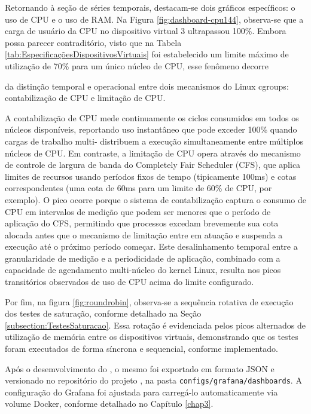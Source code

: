 Retornando à seção de séries temporais, destacam-se dois gráficos específicos: o uso de CPU e o uso de RAM. Na Figura \ref{fig:dashboard-cpu144}, observa-se que a carga de usuário da CPU no dispositivo virtual 3 ultrapassou 100\%. Embora possa parecer contraditório, visto que na Tabela \ref{tab:EspecificaçõesDispositivosVirtuais} foi estabelecido um limite máximo de utilização de 70\% para um único núcleo de CPU, esse fenômeno decorre {\color{red}da distinção temporal e operacional entre dois mecanismos do Linux cgroups: contabilização de CPU e limitação de CPU.

A contabilização de CPU mede continuamente os ciclos consumidos em todos os núcleos disponíveis, reportando uso instantâneo que pode exceder 100\% quando cargas de trabalho multi- distribuem a execução simultaneamente entre múltiplos núcleos de CPU. Em contraste, a limitação de CPU opera através do mecanismo de controle de largura de banda do Completely Fair Scheduler (CFS), que aplica limites de recursos usando períodos fixos de tempo (tipicamente 100ms) e cotas correspondentes (uma cota de 60ms para um limite de 60\% de CPU, por exemplo). O pico ocorre porque o sistema de contabilização captura o consumo de CPU em intervalos de medição que podem ser menores que o período de aplicação do CFS, permitindo que processos excedam brevemente sua cota alocada antes que o mecanismo de limitação entre em atuação e suspenda a execução até o próximo período começar. Este desalinhamento temporal entre a granularidade de medição e a periodicidade de aplicação, combinado com a capacidade de agendamento multi-núcleo do kernel Linux, resulta nos picos transitórios observados de uso de CPU acima do limite configurado.
}

Por fim, na figura \ref{fig:roundrobin}, observa-se a sequência rotativa de execução dos testes de saturação, conforme detalhado na Seção \ref{subsection:TestesSaturacao}. Essa rotação é evidenciada pelos picos alternados de utilização de memória entre os dispositivos virtuais, demonstrando que os testes foram executados de forma síncrona e sequencial, conforme implementado.

Após o desemvolvimento do , o mesmo foi exportado em formato JSON e versionado no repositório do projeto \citep{vitorcossetti2025}, na pasta \verb|configs/grafana/dashboards|. A configuração do Grafana foi ajustada para carregá-lo automaticamente via volume Docker, conforme detalhado no Capítulo \ref{chap3}.

